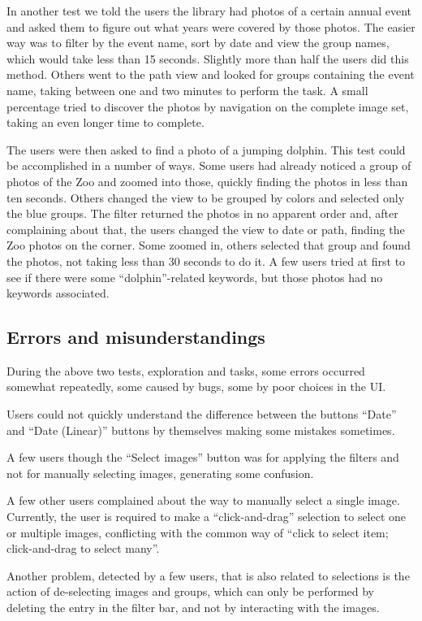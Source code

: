 In another test we told the users the library had photos of a certain annual event and asked them to figure out what years were covered by those photos. The easier way was to filter by the event name, sort by date and view the group names, which would take less than 15 seconds. Slightly more than half the users did this method. Others went to the path view and looked for groups containing the event name, taking between one and two minutes to perform the task. A small percentage tried to discover the photos by navigation on the complete image set, taking an even longer time to complete.

The users were then asked to find a photo of a jumping dolphin. This test could be accomplished in a number of ways. Some users had already noticed a group of photos of the Zoo and zoomed into those, quickly finding the photos in less than ten seconds. Others changed the view to be grouped by colors and selected only the blue groups. The filter returned the photos in no apparent order and, after complaining about that, the users changed the view to date or path, finding the Zoo photos on the corner. Some zoomed in, others selected that group and found the photos, not taking less than 30 seconds to do it. A few users tried at first to see if there were some ``dolphin''-related keywords, but those photos had no keywords associated.

\subsection{Errors and misunderstandings} %

During the above two tests, exploration and tasks, some errors occurred somewhat repeatedly, some caused by bugs, some by poor choices in the \ac{UI}.

Users could not quickly understand the difference between the buttons ``Date'' and ``Date (Linear)'' buttons by themselves making some mistakes sometimes.

A few users though the ``Select images'' button was for applying the filters and not for manually selecting images, generating some confusion.

A few other users complained about the way to manually select a single image. Currently, the user is required to make a ``click-and-drag'' selection to select one or multiple images, conflicting with the common way of ``click to select item; click-and-drag to select many''.

Another problem, detected by a few users, that is also related to selections is the action of de-selecting images and groups, which can only be performed by deleting the entry in the filter bar, and not by interacting with the images.  


